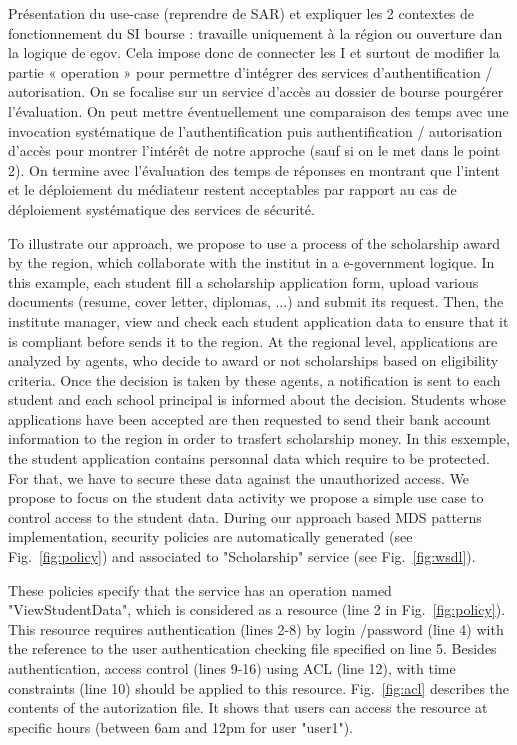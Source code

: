 \documentclass[runningheads,a4paper]{llncs}
\begin{document}
\label{sec:exemple}
Pr\'esentation du use-case (reprendre de SAR) et expliquer les 2 contextes de fonctionnement du SI bourse : travaille uniquement \`a la r\'egion ou ouverture dan la logique de egov. Cela impose donc de connecter les I et surtout de modifier la partie « operation » pour permettre d’int\'egrer des services d’authentification / autorisation. On se focalise sur un service d’acc\`es au dossier de bourse pourg\'erer l’\'evaluation.
On peut mettre \'eventuellement une comparaison des temps avec une invocation syst\'ematique de l’authentification puis authentification / autorisation d’acc\`es pour montrer l’int\'er\^et de notre approche (sauf si on le met dans le point 2). On termine avec l’\'evaluation des temps de r\'eponses en montrant que l’intent et le d\'eploiement du m\'ediateur restent acceptables par rapport au cas de d\'eploiement syst\'ematique des services de s\'ecurit\'e.


To illustrate our approach, we propose to use a process of the scholarship award by the region, which collaborate with the institut in a e-government logique. In this example, each student fill a scholarship application form, upload various documents (resume, cover letter, diplomas, ...) and submit its request. Then, the institute manager, view and check each student application data to ensure that it is compliant before sends it to the region. At the regional level, applications are analyzed by agents, who decide to award or not scholarships based on eligibility criteria. Once the decision is taken by these agents, a notification is sent to each student and each school principal is informed about the decision. Students whose applications have been accepted are then requested to send their bank account information to the region in order to trasfert scholarship money.
In this esxemple, the student application contains personnal data which require to be protected. For that, we have to secure these data against the unauthorized access.  
We propose to focus on the student data activity 
we propose a simple use case to control access to the student data. During our approach based MDS patterns implementation, security policies are automatically generated (see Fig.~\ref{fig:policy}) and associated to "Scholarship" service (see Fig.~\ref{fig:wsdl}).



 
 
These policies specify that the service has an operation named "ViewStudentData", which is considered as a resource (line 2 in Fig.~\ref{fig:policy}). This resource requires authentication (lines 2-8) by login /password (line 4) with the reference to the user authentication checking file specified on line 5. Besides authentication, access control (lines 9-16) using ACL (line 12), with time constraints (line 10) should be applied to this resource. Fig.~\ref{fig:acl} describes the contents of the  autorization file. It shows that users can access the resource at specific hours (between 6am and 12pm for user "user1").
 
\end{document}
